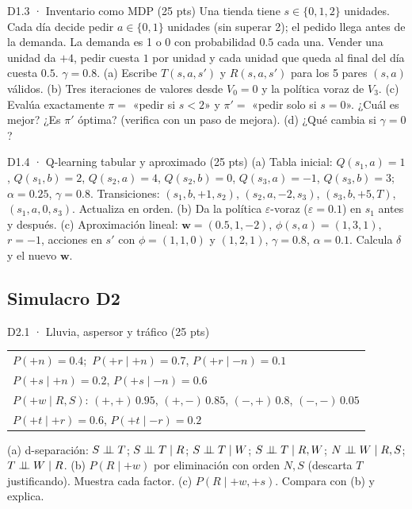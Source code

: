 \begin{ejercicio}{D1.3 · Inventario como MDP (25 pts) }
Una tienda tiene $s\in\{0,1,2\}$ unidades. Cada día decide pedir $a\in\{0,1\}$ unidades (sin superar 2); el pedido llega antes de la
demanda. La demanda es 1 o 0 con probabilidad $0.5$ cada una. Vender una unidad da $+4$, pedir cuesta $1$ por unidad y cada unidad
que queda al final del día cuesta $0.5$. $\gamma=0.8$.
(a)  Escribe $T(s,a,s')$ y $R(s,a,s')$ para los 5 pares $(s,a)$ válidos.
(b)  Tres iteraciones de valores desde $V_0=0$ y la política voraz de $V_3$.
(c)  Evalúa exactamente $\pi=$ «pedir si $s<2$» y $\pi'=$ «pedir solo si $s=0$». ¿Cuál es mejor? ¿Es $\pi'$ óptima? (verifica con un paso de mejora).
(d)  ¿Qué cambia si $\gamma=0$?
\end{ejercicio}

\begin{ejercicio}{D1.4 · Q-learning tabular y aproximado (25 pts) }
(a)  Tabla inicial: $Q(s_1,a)=1$, $Q(s_1,b)=2$, $Q(s_2,a)=4$, $Q(s_2,b)=0$, $Q(s_3,a)=-1$, $Q(s_3,b)=3$; $\alpha=0.25$, $\gamma=0.8$.
Transiciones: $(s_1,b,+1,s_2)$, $(s_2,a,-2,s_3)$, $(s_3,b,+5,T)$, $(s_1,a,0,s_3)$. Actualiza en orden.
(b)  Da la política $\varepsilon$-voraz ($\varepsilon=0.1$) en $s_1$ antes y después.
(c)  Aproximación lineal: $\mathbf w=(0.5,1,-2)$, $\phi(s,a)=(1,3,1)$, $r=-1$, acciones en $s'$ con $\phi=(1,1,0)$ y $(1,2,1)$,
$\gamma=0.8$, $\alpha=0.1$. Calcula $\delta$ y el nuevo $\mathbf w$.
\end{ejercicio}

\subsection*{Simulacro D2}

\begin{ejercicio}{D2.1 · Lluvia, aspersor y tráfico (25 pts) }
\begin{center}\figDdos\qquad
{\small\begin{tabular}{l}
$P(+n)=0.4$;\ $P(+r\mid+n)=0.7$, $P(+r\mid-n)=0.1$\\
$P(+s\mid+n)=0.2$, $P(+s\mid-n)=0.6$\\
$P(+w\mid R,S)$: $(+,+)\,0.95$, $(+,-)\,0.85$, $(-,+)\,0.8$, $(-,-)\,0.05$\\
$P(+t\mid+r)=0.6$, $P(+t\mid-r)=0.2$
\end{tabular}}\end{center}
(a)  d-separación: $S\perp\!\!\!\perp T$; $S\perp\!\!\!\perp T\mid R$; $S\perp\!\!\!\perp T\mid W$; $S\perp\!\!\!\perp T\mid R,W$; $N\perp\!\!\!\perp W\mid R,S$; $T\perp\!\!\!\perp W\mid R$.
(b)  $P(R\mid+w)$ por eliminación con orden $N,S$ (descarta $T$ justificando). Muestra cada factor.
(c)  $P(R\mid+w,+s)$. Compara con (b) y explica.
\end{ejercicio}


